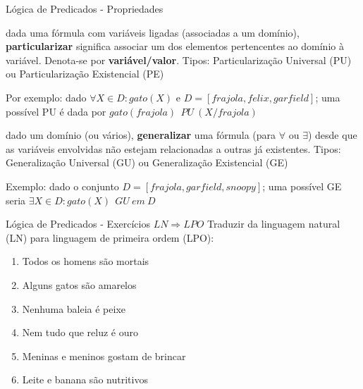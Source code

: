 \begin{frame}[t]{Lógica de Predicados - Propriedades}
	\begin{description} \itemsep 0.5cm
	\item[Particularização] dada uma fórmula com variáveis ligadas (associadas a um domínio), {\bf particularizar} significa associar um dos elementos pertencentes ao domínio à variável. Denota-se por {\bf variável/valor}. Tipos: Particularização Universal (PU) ou Particularização Existencial (PE)
	
	Por exemplo: dado $\forall X \in D: gato(X)$ e $D=[frajola, felix, garfield]$; uma possível PU é dada por $gato(frajola) ~~PU~(X/frajola)$ 
	
	\item[Generalização] dado um domínio (ou vários), {\bf generalizar} uma fórmula (para $\forall$ ou $\exists$) desde que as variáveis envolvidas não estejam relacionadas a outras já existentes. Tipos: Generalização Universal (GU) ou Generalização Existencial (GE) 
	
	Exemplo: dado o conjunto $D = [frajola, garfield, snoopy]$; uma possível GE seria $\exists X \in D: gato(X)~~GU ~em~ D$
	\end{description}
\end{frame}

\begin{frame}[t]{Lógica de Predicados - Exercícios $LN \Rightarrow LPO$}
	Traduzir da linguagem natural (LN) para linguagem de primeira ordem (LPO):
	
	\begin{enumerate}
	\item Todos os homens são mortais
	\item Alguns gatos são amarelos
	\item Nenhuma baleia é peixe
	\item Nem tudo que reluz é ouro
	\item Meninas e meninos gostam de brincar
	\item Leite e banana são nutritivos	
	\end{enumerate}
\end{frame}

